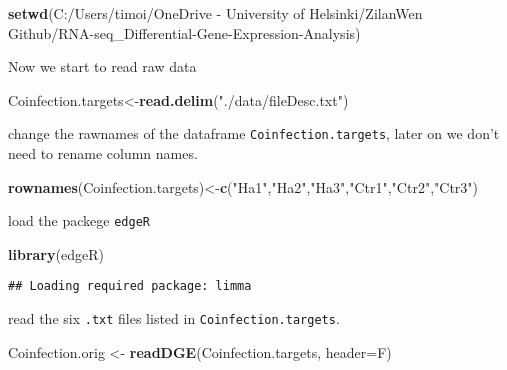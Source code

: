 \documentclass[
]{article}
\newenvironment{Shaded}{\begin{snugshade}}{\end{snugshade}}
\newcommand{\AttributeTok}[1]{\textcolor[rgb]{0.13,0.29,0.53}{#1}}
\newcommand{\FunctionTok}[1]{\textcolor[rgb]{0.13,0.29,0.53}{\textbf{#1}}}
\newcommand{\NormalTok}[1]{#1}
\newcommand{\OtherTok}[1]{\textcolor[rgb]{0.56,0.35,0.01}{#1}}
\newcommand{\StringTok}[1]{\textcolor[rgb]{0.31,0.60,0.02}{#1}}
\begin{document}
\begin{Shaded}
\begin{Highlighting}[]
\FunctionTok{setwd}\NormalTok{(}\StringTok{\textquotesingle{}C:/Users/timoi/OneDrive {-} University of Helsinki/ZilanWen Github/RNA{-}seq\_Differential{-}Gene{-}Expression{-}Analysis\textquotesingle{}}\NormalTok{)}
\end{Highlighting}
\end{Shaded}

Now we start to read raw data

\begin{Shaded}
\begin{Highlighting}[]
\NormalTok{Coinfection.targets}\OtherTok{\textless{}{-}}\FunctionTok{read.delim}\NormalTok{(}\StringTok{"./data/fileDesc.txt"}\NormalTok{)}
\end{Highlighting}
\end{Shaded}

change the rawnames of the dataframe \texttt{Coinfection.targets}, later
on we don't need to rename column names.

\begin{Shaded}
\begin{Highlighting}[]
\FunctionTok{rownames}\NormalTok{(Coinfection.targets)}\OtherTok{\textless{}{-}}\FunctionTok{c}\NormalTok{(}\StringTok{"Ha1"}\NormalTok{,}\StringTok{"Ha2"}\NormalTok{,}\StringTok{"Ha3"}\NormalTok{,}\StringTok{"Ctr1"}\NormalTok{,}\StringTok{"Ctr2"}\NormalTok{,}\StringTok{"Ctr3"}\NormalTok{)}
\end{Highlighting}
\end{Shaded}

load the packege \texttt{edgeR}

\begin{Shaded}
\begin{Highlighting}[]
\FunctionTok{library}\NormalTok{(edgeR)}
\end{Highlighting}
\end{Shaded}

\begin{verbatim}
## Loading required package: limma
\end{verbatim}

read the six \texttt{.txt} files listed in \texttt{Coinfection.targets}.

\begin{Shaded}
\begin{Highlighting}[]
\NormalTok{Coinfection.orig }\OtherTok{\textless{}{-}} \FunctionTok{readDGE}\NormalTok{(Coinfection.targets, }\AttributeTok{header=}\NormalTok{F)}
\end{Highlighting}
\end{Shaded}
\end{document}
